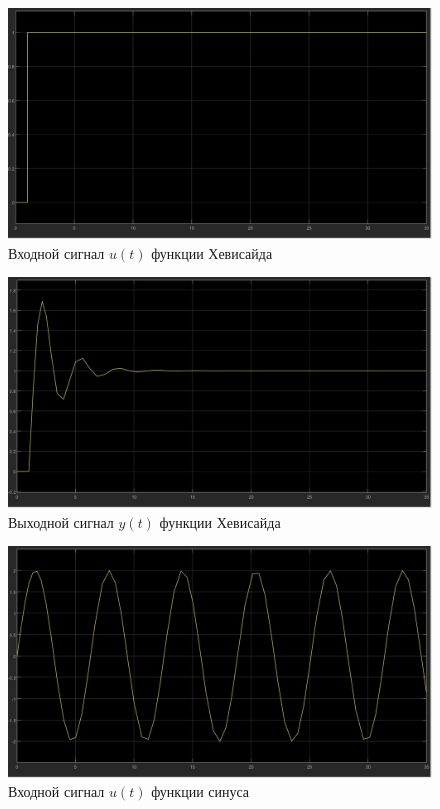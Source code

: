 \documentclass[a4paper, 12pt]{article}
\begin{document}
    \begin{figure}[H]
        \centering
        \includegraphics[scale=0.3]{1_t_u_2.jpg}
        \captionsetup{skip=0pt}
        \caption{Входной сигнал $u(t)$ функции Хевисайда}
        \label{fig:1_t_u_2}
    \end{figure}
    \begin{figure}[H]
        \centering
        \includegraphics[scale=0.3]{1_t_y_2.jpg}
        \captionsetup{skip=0pt}
        \caption{Выходной сигнал $y(t)$ функции Хевисайда}
        \label{fig:1_t_y_2}
    \end{figure}
    \begin{figure}[H]
        \centering
        \includegraphics[scale=0.3]{sin_u_2.jpg}
        \captionsetup{skip=0pt}
        \caption{Входной сигнал $u(t)$ функции синуса}
        \label{fig:sin_u_2}
    \end{figure}
\end{document}
